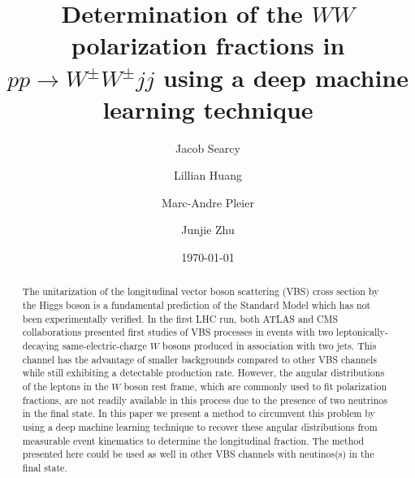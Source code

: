 \documentclass[aps,prd,twocolumn,showpacs,superscriptaddress]{revtex4}  %
\begin{document}
\title{Determination of the $WW$ polarization fractions in $pp \rightarrow W^\pm W^\pm jj$ using a deep machine learning technique}
\author{Jacob Searcy}
\author{Lillian Huang}
\author{Marc-Andre Pleier}
\author{Junjie Zhu}

\date{\today}

\begin{abstract}
The unitarization of the longitudinal vector boson scattering (VBS) cross section by the Higgs boson is 
a fundamental prediction of the Standard Model which has not been experimentally verified. In the first LHC run, 
both ATLAS and CMS collaborations presented first studies of VBS processes in events with two leptonically-decaying same-electric-charge 
$W$ bosons produced in association with two jets. This channel has the advantage of smaller backgrounds 
compared to other VBS channels while still exhibiting a detectable production rate. However, the angular distributions of the leptons in the $W$ boson rest frame, which are commonly used to 
fit polarization fractions, are not readily available in this process due to the presence of two neutrinos in the final state. 
In this paper we present a method to circumvent this problem by using a deep machine learning technique to recover these angular distributions from measurable event kinematics to determine the longitudinal fraction.  The method presented here could be used as well in other VBS channels with neutinos(s) in the final state. 
\end{abstract}

\maketitle


\end{document}
